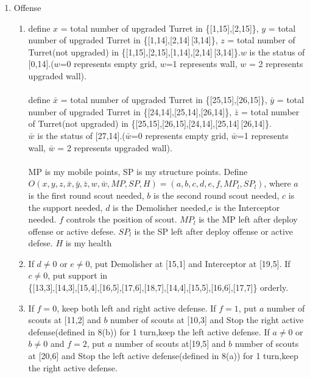 \documentclass[12pt]{article}
\begin{document}
\begin{enumerate}
\item Offense
\begin{enumerate}
\item define $x$ = total number of upgraded Turret in \{[1,15],[2,15]\}, $y$ = total number of upgraded Turret in \{[1,14],[2,14]\,[3,14]\}, $z$ = total number of Turret(not upgraded) in  \{[1,15],[2,15],[1,14],[2,14]\,[3,14]\}.$w$ is the status of [0,14].($w$=0 represents empty grid, $w$=1 represents wall, $w$ = 2 represents upgraded wall).\\\\define $\bar{x}$ = total number of upgraded Turret in \{[25,15],[26,15]\}, $\bar{y}$ = total number of upgraded Turret in \{[24,14],[25,14],[26,14]\}, $\bar{z}$ = total number of Turret(not upgraded) in  \{[25,15],[26,15],[24,14],[25,14]\,[26,14]\}.\\$\bar{w}$ is the status of [27,14].($\bar{w}$=0 represents empty grid, $\bar{w}$=1 represents wall, $\bar{w}$ = 2 represents upgraded wall).\\ \\MP is my mobile points, SP is my structure points. Define\\ $O(x,y,z,\bar{x},\bar{y},\bar{z},w,\bar{w},MP,SP,H) = (a,b,c,d,e,f,MP_l,SP_l)$, where $a$ is the first round scout needed, $b$ is the second round scout needed, $c$ is the support needed, $d$ is the Demolisher needed,$e$ is the Interceptor needed. $f$ controls the position of scout. $MP_l$ is the MP left after deploy offense or active defese. $SP_l$ is the SP left after deploy offense or active defese. $H$ is my health
\item If $d \neq 0$ or $e \neq 0$, put Demolisher at  [15,1] and Interceptor at [19,5]. If $c \neq 0$, put support in\\ \{[13,3],[14,3],[15,4],[16,5],[17,6],[18,7],[14,4],[15,5],[16,6],[17,7]\} orderly.
\item If $f =0$, keep both left and right active defense. If $f =1$, put $a$ number of scouts at [11,2] and $b$ number of scouts at [10,3] and Stop the right active defense(defined in 8(b)) for 1 turn,keep the left active defense. If $a \neq 0$ or $b \neq 0$ and $f =2$, put $a$ number of scouts at[19,5] and $b$ number of scouts at [20,6] and Stop the left active defense(defined in 8(a)) for 1 turn,keep the right active defense.
\end{enumerate}
\end{enumerate}
\end{document}
